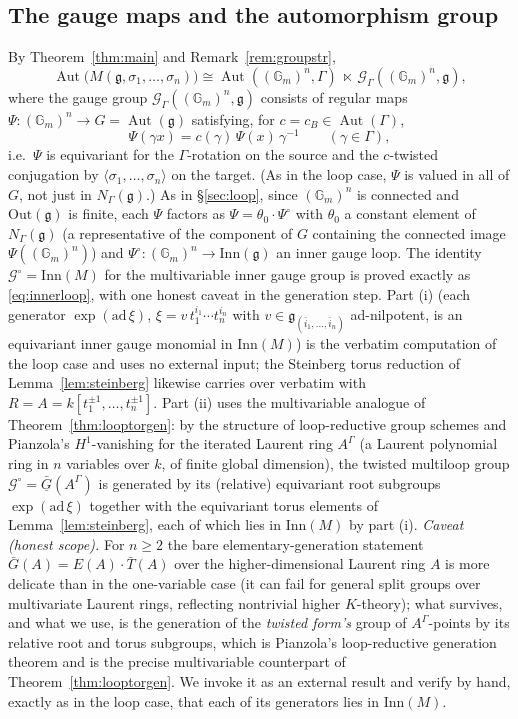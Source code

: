 \documentclass{amsart}
\theoremstyle{definition}
\DeclareMathOperator{\Aut}{Aut}
\newcommand{\Gm}{\mathbb{G}_m}
\newcommand{\g}{\mathfrak{g}}
\begin{document}
\subsection{The gauge maps and the automorphism group}
By Theorem~\ref{thm:main} and Remark~\ref{rem:groupstr},
\[
\Aut\bigl(M(\g,\sigma_1,\dots,\sigma_n)\bigr)\cong
\Aut((\Gm)^n,\Gamma)\ \ltimes\ \mathcal G_\Gamma((\Gm)^n,\g),
\]
where the gauge group $\mathcal G_\Gamma((\Gm)^n,\g)$ consists of regular
maps $\Psi\colon(\Gm)^n\to G=\Aut(\g)$ satisfying, for $c=c_B\in\Aut(\Gamma)$,
\[
\Psi(\gamma x)=c(\gamma)\,\Psi(x)\,\gamma^{-1}\qquad(\gamma\in\Gamma),
\]
i.e.\ $\Psi$ is equivariant for the $\Gamma$-rotation on the source and the
$c$-twisted conjugation by $\langle\sigma_1,\dots,\sigma_n\rangle$ on the
target.  (As in the loop case, $\Psi$ is valued in all of $G$, not just in
$N_\Gamma(\g)$.)  As in \S\ref{sec:loop}, since $(\Gm)^n$ is connected and
$\mathrm{Out}(\g)$ is finite, each $\Psi$ factors as
$\Psi=\theta_0\cdot\Psi^\circ$ with $\theta_0$ a constant element of
$N_\Gamma(\g)$ (a representative of the component of $G$ containing the
connected image $\Psi((\Gm)^n)$) and $\Psi^\circ\colon(\Gm)^n\to
\mathrm{Inn}(\g)$ an inner gauge loop.  The identity
$\mathcal G^\circ=\mathrm{Inn}(M)$ for the multivariable inner gauge group
is proved exactly as \eqref{eq:innerloop}, with one honest caveat in the
generation step.  Part (i) (each generator $\exp(\mathrm{ad}\,\xi)$,
$\xi=v\,t^{i_1}_1\cdots t^{i_n}_n$ with $v\in\g_{(\bar i_1,\dots,\bar i_n)}$
ad-nilpotent, is an equivariant inner gauge monomial in $\mathrm{Inn}(M)$)
is the verbatim computation of the loop case and uses no external input; the
Steinberg torus reduction of Lemma~\ref{lem:steinberg} likewise carries over
verbatim with $R=A=k[t_1^{\pm1},\dots,t_n^{\pm1}]$.  Part (ii) uses the
multivariable analogue of Theorem~\ref{thm:looptorgen}: by the structure of
loop-reductive group schemes and Pianzola's $H^1$-vanishing for the iterated
Laurent ring $A^\Gamma$ (a Laurent polynomial ring in $n$ variables over
$k$, of finite global dimension), the twisted multiloop group
$\mathcal G^\circ=\underline{\bar G}(A^\Gamma)$ is generated by its
(relative) equivariant root subgroups $\exp(\mathrm{ad}\,\xi)$ together with
the equivariant torus elements of Lemma~\ref{lem:steinberg}, each of which
lies in $\mathrm{Inn}(M)$ by part (i).  \emph{Caveat (honest scope).}  For
$n\ge2$ the bare elementary-generation statement $\bar G(A)=E(A)\cdot\bar
T(A)$ over the higher-dimensional Laurent ring $A$ is more delicate than in
the one-variable case (it can fail for general split groups over multivariate
Laurent rings, reflecting nontrivial higher $K$-theory); what survives, and
what we use, is the generation of the \emph{twisted form's} group of
$A^\Gamma$-points by its relative root and torus subgroups, which is Pianzola's
loop-reductive generation theorem and is the precise multivariable
counterpart of Theorem~\ref{thm:looptorgen}.  We invoke it as an external
result and verify by hand, exactly as in the loop case, that each of its
generators lies in $\mathrm{Inn}(M)$.
\end{document}
